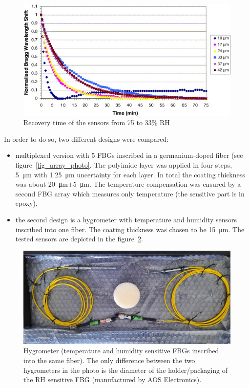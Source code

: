 \begin{figure}[!h]
\centering
\includegraphics[width=0.75\columnwidth]{Chapter5/images/time_response_yeo.jpg}
\caption{Recovery time of the sensors from 75 to 33\% RH~\cite{YEO_PI}}
\label{fig:yeo2}
\end{figure}

In order to do so, two different designs were compared:
\begin{itemize}
    \item multiplexed version with 5 \glspl{FBG} inscribed in a germanium-doped fiber (see figure~\ref{fig_array_photo}. The polyimide layer was applied in four steps, \SI{5}{\micro\metre} with \SI{1.25}{\micro\metre} uncertainty for each layer. In total the coating thickness was about \SI{20}{\micro\metre}$\pm$\SI{5}{\micro\metre}. The temperature compensation was ensured by a second \gls{FBG} array which measures only temperature (the sensitive part is in epoxy),
    \item the second design is a hygrometer with temperature and humidity sensors inscribed into one fiber. The coating thickness was chosen to be \SI{15}{\micro\metre}. The tested sensors are depicted in the figure~\ref{fig_single_photo}.
\end{itemize}

\begin{figure}[!h]
\centering
\includegraphics[width=0.75\columnwidth]{Chapter5/images/single1.jpeg}
\caption{Hygrometer (temperature and humidity sensitive \glspl{FBG} inscribed into the same fiber). The only difference between the two hygrometers in the photo is the diameter of the holder/packaging of the \gls{RH} sensitive \gls{FBG} (manufactured by AOS Electronics).}
\label{fig_single_photo}
\end{figure}

